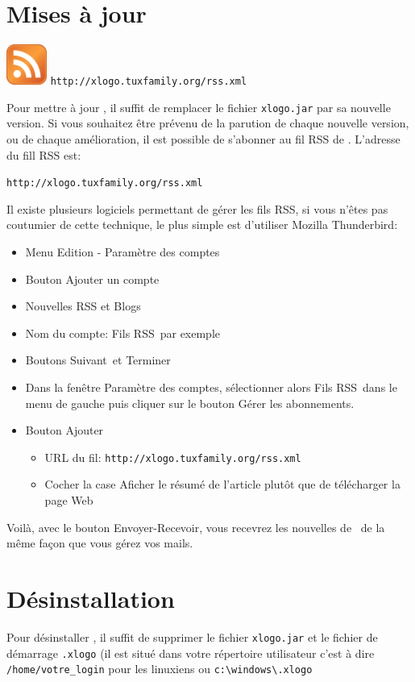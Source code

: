 \section{Mises à jour}
\begin{center}
\includegraphics{images/rss.png} \hspace{1cm} \texttt{http://xlogo.tuxfamily.org/rss.xml}
\end{center}
Pour mettre à jour \xlogo, il suffit de remplacer le fichier \texttt{xlogo.jar} par sa nouvelle version. 
Si vous souhaitez être prévenu de la parution de chaque nouvelle version, ou de chaque amélioration, il est possible de s'abonner au fil RSS de \xlogo. L'adresse du fill RSS est:
\begin{center}
 \texttt{http://xlogo.tuxfamily.org/rss.xml}
\end{center}
Il existe plusieurs logiciels permettant de gérer les fils RSS, si vous n'êtes pas coutumier de cette technique, le plus simple est d'utiliser Mozilla Thunderbird:
\begin{itemize}
 \item Menu Edition - Paramètre des comptes
 \item Bouton \og Ajouter un compte\fg
 \item \og Nouvelles RSS et Blogs\fg
 \item Nom du compte: \og Fils RSS\fg\ par exemple
 \item Boutons \og Suivant\fg\ et \og Terminer\fg
 \item Dans la fenêtre \og Paramètre des comptes\fg, sélectionner alors \og Fils RSS\fg\ dans le menu de gauche puis cliquer sur le bouton \og Gérer les abonnements\fg.
 \item Bouton \og Ajouter\fg
	\begin{itemize}
 	\item URL du fil: \texttt{http://xlogo.tuxfamily.org/rss.xml}
	\item  Cocher la case \og Aficher le résumé de l'article plutôt que de télécharger la page Web\fg
	\end{itemize}
\end{itemize}
\vspace*{0.2cm}
Voilà, avec le bouton \og Envoyer-Recevoir\fg, vous recevrez les nouvelles de \xlogo\ de la même façon que vous gérez vos mails.
\section{Désinstallation}\label{fichier_perso}
Pour désinstaller \xlogo, il suffit de supprimer le fichier \texttt{xlogo.jar} et le fichier de démarrage \texttt{.xlogo} (il est situé dans votre répertoire utilisateur c'est à dire \texttt{/home/votre\_login} pour les linuxiens ou \texttt{c:\textbackslash windows\textbackslash.xlogo}
